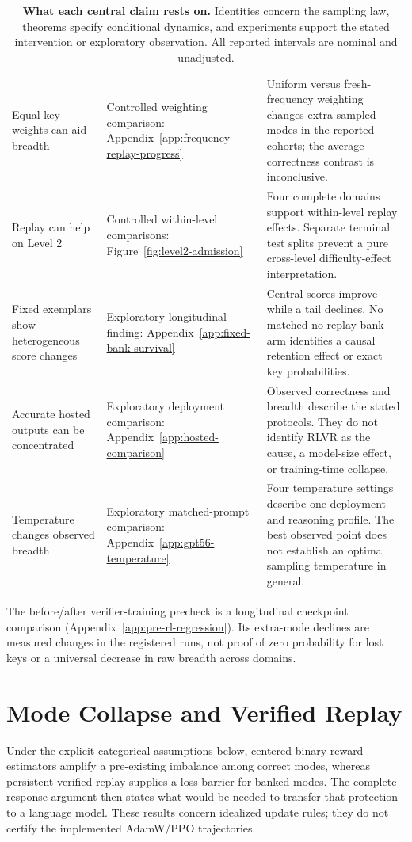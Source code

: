 \documentclass{article}
\newcommand{\1}{\mathbf 1}
\theoremstyle{remark}
\theoremstyle{definition}
\theoremstyle{plain}
\begin{document}
\begin{table}[H]
\begin{tabularx}{\linewidth}{@{}p{.21\linewidth}p{.22\linewidth}X@{}}
Equal key weights can aid breadth & Controlled weighting comparison:
Appendix~\ref{app:frequency-replay-progress} &
Uniform versus fresh-frequency weighting changes extra sampled modes in the
reported cohorts; the average correctness contrast is inconclusive. \\
Replay can help on Level 2 & Controlled within-level comparisons:
Figure~\ref{fig:level2-admission} &
Four complete domains support within-level replay effects. Separate terminal
test splits prevent a pure cross-level difficulty-effect interpretation. \\
Fixed exemplars show heterogeneous score changes & Exploratory longitudinal finding:
Appendix~\ref{app:fixed-bank-survival} &
Central scores improve while a tail declines. No matched no-replay bank arm
identifies a causal retention effect or exact key probabilities. \\
Accurate hosted outputs can be concentrated & Exploratory deployment comparison:
Appendix~\ref{app:hosted-comparison} &
Observed correctness and breadth describe the stated protocols. They do not
identify RLVR as the cause, a model-size effect, or training-time collapse. \\
Temperature changes observed breadth & Exploratory matched-prompt comparison:
Appendix~\ref{app:gpt56-temperature} &
Four temperature settings describe one deployment and reasoning profile.
The best observed point does not establish an optimal sampling temperature in general. \\
\bottomrule
\end{tabularx}
\caption{\textbf{What each central claim rests on.} Identities concern the
sampling law, theorems specify conditional dynamics, and experiments support
the stated intervention or exploratory observation. All reported intervals
are nominal and unadjusted.}
\label{tab:claim-basis}
\end{table}

The before/after verifier-training precheck is a longitudinal checkpoint
comparison (Appendix~\ref{app:pre-rl-regression}). Its extra-mode declines
are measured changes in the registered runs, not proof of zero probability
for lost keys or a universal decrease in raw breadth across domains.

\section{Mode Collapse and Verified Replay}
\label{app:theory}

Under the explicit categorical assumptions below, centered binary-reward
estimators amplify a pre-existing imbalance among correct modes,
whereas persistent verified replay supplies a loss barrier for banked modes.
The complete-response argument then states what would be needed to transfer
that protection to a language model. These results concern idealized update
rules; they do not certify the implemented AdamW/PPO trajectories.
\end{document}
